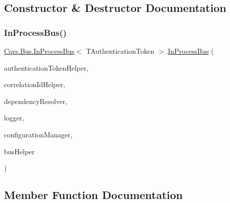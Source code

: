 \subsection{Constructor \& Destructor Documentation}
\mbox{\label{classCqrs_1_1Bus_1_1InProcessBus_a64bea583461562783d97cd98ff0dff91}} 
\subsubsection{\texorpdfstring{In\+Process\+Bus()}{InProcessBus()}}
{\footnotesize\ttfamily \hyperlink{classCqrs_1_1Bus_1_1InProcessBus}{Cqrs.\+Bus.\+In\+Process\+Bus}$<$ T\+Authentication\+Token $>$.\hyperlink{classCqrs_1_1Bus_1_1InProcessBus}{In\+Process\+Bus} (\begin{DoxyParamCaption}\item[{\hyperlink{interfaceCqrs_1_1Authentication_1_1IAuthenticationTokenHelper}{I\+Authentication\+Token\+Helper}$<$ T\+Authentication\+Token $>$}]{authentication\+Token\+Helper,  }\item[{I\+Correlation\+Id\+Helper}]{correlation\+Id\+Helper,  }\item[{\hyperlink{interfaceCqrs_1_1Configuration_1_1IDependencyResolver}{I\+Dependency\+Resolver}}]{dependency\+Resolver,  }\item[{I\+Logger}]{logger,  }\item[{\hyperlink{interfaceCqrs_1_1Configuration_1_1IConfigurationManager}{I\+Configuration\+Manager}}]{configuration\+Manager,  }\item[{\hyperlink{interfaceCqrs_1_1Bus_1_1IBusHelper}{I\+Bus\+Helper}}]{bus\+Helper }\end{DoxyParamCaption})}



\subsection{Member Function Documentation}
\mbox{\label{classCqrs_1_1Bus_1_1InProcessBus_a603950d39c407d5b9661dc0937fa67cc}} 
